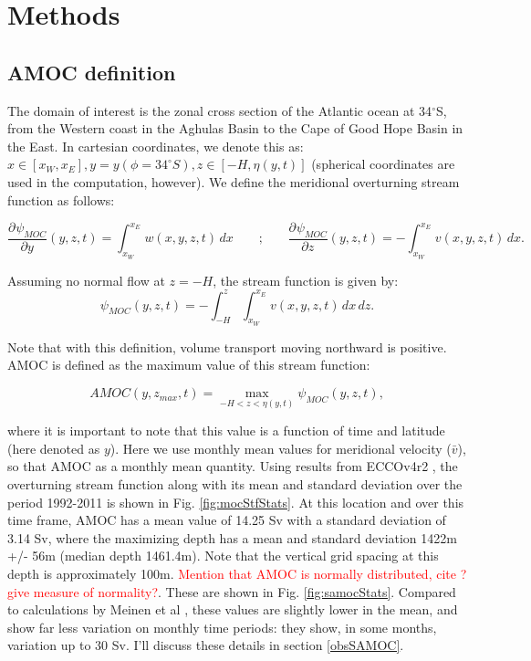 \documentclass[a4paper,11pt]{article}
\newcommand{\pderiv}[3][]{%
  \ensuremath{\frac{\partial^{#1} {#2}}{\partial {#3}^{#1}}}}
\newcommand{\red}[1]{\textcolor{red}{#1}}
\begin{document}
\section{Methods}
\label{methods}
  
  \subsection{AMOC definition}
  
    The domain of interest is the zonal cross section of the Atlantic ocean at 34$^{\circ}$S, from the Western coast in the Aghulas Basin to the Cape of Good Hope Basin in the East. In cartesian coordinates, we denote this as: $x \in [x_W,x_E], y = y(\phi=34^{\circ}S), z \in [-H,\eta(y,t)]$ (spherical coordinates are used in the computation, however).  We define the meridional overturning stream function as follows: 
    
    \begin{equation}
      \pderiv[]{\psi_{MOC}}{y}(y,z,t) = \int_{x_W}^{x_E}w(x,y,z,t)\,dx \qquad\text{;}\qquad \pderiv[]{\psi_{MOC}}{z}(y,z,t) = -\int_{x_W}^{x_E}v(x,y,z,t)\,dx .
     \label{eq:mocStf}
    \end{equation}

   Assuming no normal flow at $z = -H$, the stream function is given by:
   \begin{equation}
    \psi_{MOC}(y,z,t) = -\int_{-H}^{z}\int_{x_W}^{x_E}v(x,y,z,t)\,dx\,dz .
    \label{eq:mocStf2}
   \end{equation}

   Note that with this definition, volume transport moving northward is positive. AMOC is defined as the maximum value of this stream function: 
   
   \begin{equation}
    AMOC(y,z_{max},t) = \max_{-H < z < \eta(y,t)}{\psi_{MOC}(y,z,t)} ,
    \label{eq:amoc}
   \end{equation}

   where it is important to note that this value is a function of time and latitude (here denoted as $y$). Here we use monthly mean values for meridional velocity ($\bar{v}$), so that AMOC as a monthly mean quantity. Using results from ECCOv4r2 \cite{forgetEccov4}, the overturning stream function along with its mean and standard deviation over the period 1992-2011 is shown in Fig. \ref{fig:mocStfStats}. At this location and over this time frame, AMOC has a mean value of 14.25 Sv with a standard deviation of 3.14 Sv, where the maximizing depth has a mean and standard deviation 1422m +/- 56m (median depth 1461.4m). Note that the vertical grid spacing at this depth is approximately 100m. \red{Mention that AMOC is normally distributed, cite \cite{wunschAndHeimbach_AMOC}? give measure of normality?}. These are shown in Fig. \ref{fig:samocStats}. Compared to calculations by Meinen et al \cite{meinenSamoc}, these values are slightly lower in the mean, and show far less variation on monthly time periods: they show, in some months, variation up to 30 Sv. I'll discuss these details in section \ref{obsSAMOC}. 
\end{document}
